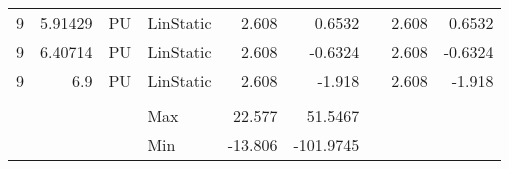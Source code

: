 \begin{table}[htbp]
{\begin{tabular}{rrrlrrrrr}
    \multicolumn{1}{l}{9} & 5.91429 & \multicolumn{1}{l}{PU} & LinStatic & 2.608 & 0.6532 &     & 2.608 & 0.6532 \\
    \multicolumn{1}{l}{9} & 6.40714 & \multicolumn{1}{l}{PU} & LinStatic & 2.608 & -0.6324 &     & 2.608 & -0.6324 \\
    \multicolumn{1}{l}{9} & 6.9 & \multicolumn{1}{l}{PU} & LinStatic & 2.608 & -1.918 &     & 2.608 & -1.918 \\
        &     &     &     &     &     &     &     &  \\
        &     &     & Max & 22.577 & 51.5467 &     &     &  \\
        &     &     & Min & -13.806 & -101.9745 &     &     &  \\
    \end{tabular}%
    }
  \label{tab:addlabel}%
\end{table}%

